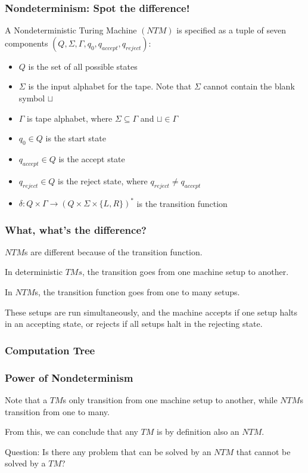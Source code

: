 \documentclass[aspectratio=169]{beamer}
\begin{document}
\begin{frame}
\frametitle{Nondeterminism: Spot the difference!}
A Nondeterministic Turing Machine $(NTM)$ is specified as a tuple of seven components $(Q, \Sigma, \Gamma, q_0, q_{accept}, q_{reject})$:

\begin{itemize}
    \item $Q$ is the set of all possible states
    \item $\Sigma$ is the input alphabet for the tape. Note that $\Sigma$ cannot contain the blank symbol $\sqcup$
    \item $\Gamma$ is tape alphabet, where $\Sigma \subseteq \Gamma$ and $\sqcup \in \Gamma$
    \item $q_0 \in Q$ is the start state
    \item $q_{accept} \in Q$ is the accept state
    \item $q_{reject} \in Q$ is the reject state, where $q_{reject} \neq q_{accept}$
    \item $\delta: Q \times \Gamma \to (Q \times \Sigma \times \{L, R\})^*$ is the transition function
\end{itemize}
\end{frame}

\begin{frame}
\frametitle{What, what's the difference?}
$NTM$s are different because of the transition function.

In deterministic $TMs$, the transition goes from one machine setup to another.

In $NTM$s, the transition function goes from one to many setups.

These setups are run simultaneously, and the machine accepts if one setup halts in an accepting state, or rejects if all setups halt in the rejecting state.
\end{frame}

\begin{frame}
\frametitle{Computation Tree}

\end{frame}

\begin{frame}
\frametitle{Power of Nondeterminism}
Note that a $TM$s only transition from one machine setup to another, while $NTM$s transition from one to many.

From this, we can conclude that any $TM$ is by definition also an $NTM$.

Question: Is there any problem that can be solved by an $NTM$ that cannot be solved by a $TM$?
\end{frame}
\end{document}
